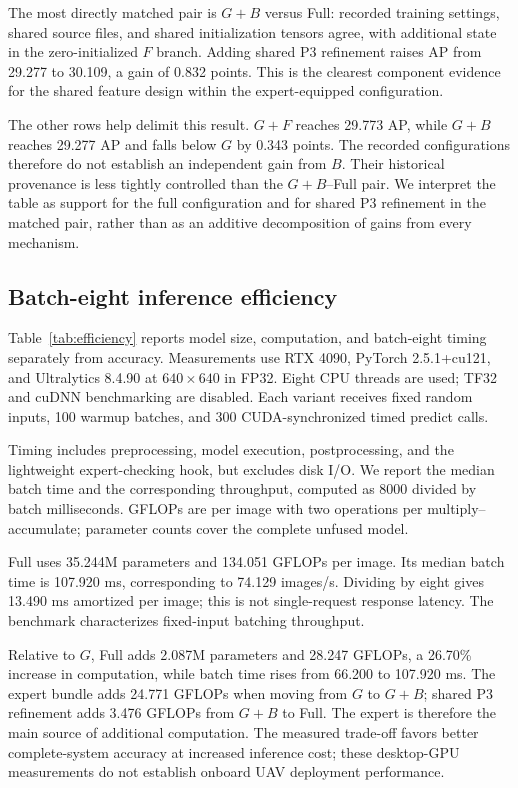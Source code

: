 The most directly matched pair is $G+B$ versus Full: recorded training settings, shared source files, and shared initialization tensors agree, with additional state in the zero-initialized $F$ branch. Adding shared P3 refinement raises AP from 29.277 to 30.109, a gain of 0.832 points. This is the clearest component evidence for the shared feature design within the expert-equipped configuration.

The other rows help delimit this result. $G+F$ reaches 29.773 AP, while $G+B$ reaches 29.277 AP and falls below $G$ by 0.343 points. The recorded configurations therefore do not establish an independent gain from $B$. Their historical provenance is less tightly controlled than the $G+B$--Full pair. We interpret the table as support for the full configuration and for shared P3 refinement in the matched pair, rather than as an additive decomposition of gains from every mechanism.

\subsection{Batch-eight inference efficiency}
Table~\ref{tab:efficiency} reports model size, computation, and batch-eight timing separately from accuracy. Measurements use RTX 4090, PyTorch 2.5.1+cu121, and Ultralytics 8.4.90 at $640\times640$ in FP32. Eight CPU threads are used; TF32 and cuDNN benchmarking are disabled. Each variant receives fixed random inputs, 100 warmup batches, and 300 CUDA-synchronized timed predict calls.

Timing includes preprocessing, model execution, postprocessing, and the lightweight expert-checking hook, but excludes disk I/O. We report the median batch time and the corresponding throughput, computed as 8000 divided by batch milliseconds. GFLOPs are per image with two operations per multiply--accumulate; parameter counts cover the complete unfused model.


Full uses 35.244M parameters and 134.051 GFLOPs per image. Its median batch time is 107.920 ms, corresponding to 74.129 images/s. Dividing by eight gives 13.490 ms amortized per image; this is not single-request response latency. The benchmark characterizes fixed-input batching throughput.

Relative to $G$, Full adds 2.087M parameters and 28.247 GFLOPs, a 26.70\% increase in computation, while batch time rises from 66.200 to 107.920 ms. The expert bundle adds 24.771 GFLOPs when moving from $G$ to $G+B$; shared P3 refinement adds 3.476 GFLOPs from $G+B$ to Full. The expert is therefore the main source of additional computation. The measured trade-off favors better complete-system accuracy at increased inference cost; these desktop-GPU measurements do not establish onboard UAV deployment performance.

